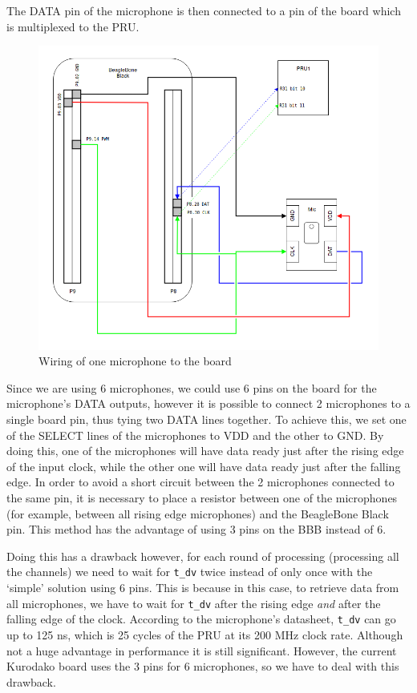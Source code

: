 \documentclass[]{report}
\begin{document}
The DATA pin of the microphone is then connected to a pin of the board which is multiplexed to the PRU.

\begin{figure}[h]
\centering
\includegraphics[width=0.6\linewidth]{Pictures/wiring.png}
\caption{Wiring of one microphone to the board}
\end{figure}

Since we are using 6 microphones, we could use 6 pins on the board for the microphone's DATA outputs, however it is possible to connect 2 microphones to a single board pin, thus tying two DATA lines together. To achieve this, we set one of the SELECT lines of the microphones to VDD and the other to GND. By doing this, one of the microphones will have data ready just after the rising edge of the input clock, while the other one will have data ready just after the falling edge. In order to avoid a short circuit between the 2 microphones connected to the same pin, it is necessary to place a resistor between one of the microphones (for example, between all rising edge microphones) and the BeagleBone Black pin. This method has the advantage of using 3 pins on the BBB instead of 6.

Doing this has a drawback however, for each round of processing (processing all the channels) we need to wait for \texttt{t\_dv} twice instead of only once with the `simple' solution using 6 pins. This is because in this case, to retrieve data from all microphones, we have to wait for \texttt{t\_dv} after the rising edge \emph{and} after the falling edge of the clock. According to the microphone's datasheet, \texttt{t\_dv} can go up to 125 ns, which is 25 cycles of the PRU at its 200 MHz clock rate. Although not a huge advantage in performance it is still significant. However, the current Kurodako board uses the 3 pins for 6 microphones, so we have to deal with this drawback.
\end{document}
